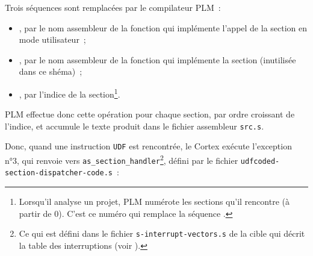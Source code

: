 Trois séquences sont remplacées par le compilateur PLM~:
\begin{itemize}
\item {}, par le nom assembleur de la fonction qui implémente l'appel de la section en mode utilisateur~;
\item {}, par le nom assembleur de la fonction qui implémente la section (inutilisée dans ce shéma)~;
\item {}, par l'indice de la section\footnote{Lorsqu'il analyse un projet, PLM numérote les sections qu'il rencontre (à partir de $0$). C'est ce numéro qui remplace la séquence .}.
\end{itemize}

PLM effectue donc cette opération pour chaque section, par ordre croissant de l'indice, et accumule le texte produit dans le fichier assembleur \texttt{src.s}.

Donc, quand une instruction \texttt{UDF} est rencontrée, le Cortex exécute l'exception n°3, qui renvoie vers \texttt{as\_section\_handler}\footnote{Ce qui est défini dans le fichier \texttt{s-interrupt-vectors.s} de la cible qui décrit la table des interruptions (voir ).}, défini par le fichier \texttt{udfcoded-section-dispatcher-code.s}~:


